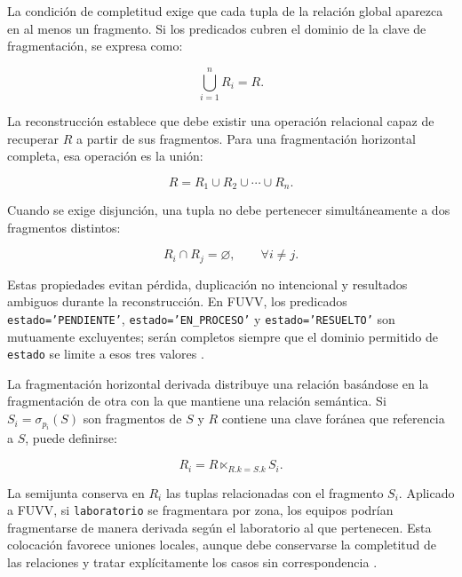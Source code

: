 \documentclass[12pt,a4paper]{article}
\begin{document}
La condición de completitud exige que cada tupla de la relación global aparezca en al menos un fragmento. Si los predicados cubren el dominio de la clave de fragmentación, se expresa como:

\begin{equation}
  \bigcup_{i=1}^{n} R_i = R.
  \label{eq:completitud}
\end{equation}

La reconstrucción establece que debe existir una operación relacional capaz de recuperar $R$ a partir de sus fragmentos. Para una fragmentación horizontal completa, esa operación es la unión:

\begin{equation}
  R = R_1 \cup R_2 \cup \cdots \cup R_n.
  \label{eq:reconstruccion-horizontal}
\end{equation}

Cuando se exige disjunción, una tupla no debe pertenecer simultáneamente a dos fragmentos distintos:

\begin{equation}
  R_i \cap R_j = \varnothing, \qquad \forall i \neq j.
  \label{eq:disjuncion}
\end{equation}

Estas propiedades evitan pérdida, duplicación no intencional y resultados ambiguos durante la reconstrucción. En FUVV, los predicados \texttt{estado='PENDIENTE'}, \texttt{estado='EN\_PROCESO'} y \texttt{estado='RESUELTO'} son mutuamente excluyentes; serán completos siempre que el dominio permitido de \texttt{estado} se limite a esos tres valores \cite{ozsu2020distributed,danach2024fragmentation}.

La fragmentación horizontal derivada distribuye una relación basándose en la fragmentación de otra con la que mantiene una relación semántica. Si $S_i=\sigma_{p_i}(S)$ son fragmentos de $S$ y $R$ contiene una clave foránea que referencia a $S$, puede definirse:

\begin{equation}
  R_i = R \ltimes_{R.k=S.k} S_i.
  \label{eq:fragmentacion-derivada}
\end{equation}

La semijunta conserva en $R_i$ las tuplas relacionadas con el fragmento $S_i$. Aplicado a FUVV, si \texttt{laboratorio} se fragmentara por zona, los equipos podrían fragmentarse de manera derivada según el laboratorio al que pertenecen. Esta colocación favorece uniones locales, aunque debe conservarse la completitud de las relaciones y tratar explícitamente los casos sin correspondencia \cite{ozsu2020distributed,schafer2020benchmarking}.
\end{document}
